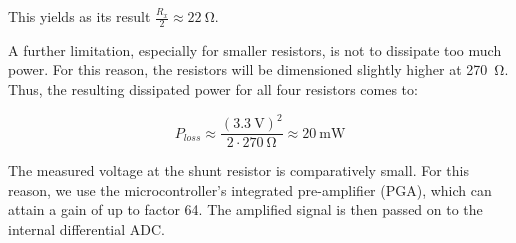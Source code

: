 This yields as its result $\frac{R_x}{2} \approx \SI{22}{\ohm}$.


\begin{minipage}{.50\textwidth}
    A  further  limitation,  especially  for  smaller  resistors,  is  not  to
    dissipate  too  much  power. For  this   reason,  the  resistors  will  be
    dimensioned  slightly   higher  at  \SI{270}{\ohm}. Thus,   the  resulting
    dissipated power for all four resistors comes to:
\end{minipage}
\begin{minipage}{.50\textwidth}
    \begin{equation}
        P_{loss} \approx \frac{\left(\SI{3.3}{\volt}\right)^2}{2\cdot \SI{270}{\ohm}} \approx \SI{20}{\milli\watt}
    \end{equation}
\end{minipage}

The measured  voltage at the  shunt resistor is comparatively  small. For this
reason, we use the microcontroller's integrated pre-amplifier (PGA), which can
attain a gain  of up to factor  64. The amplified signal is then  passed on to
the internal differential ADC.
